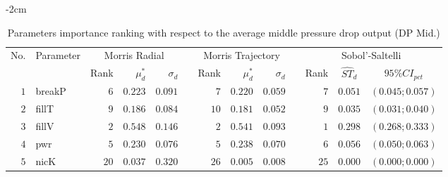 \begin{table*}[!htbp]\centering
{}
\begin{adjustwidth*}{}{-2cm}
\caption{Parameters importance ranking with respect to the average middle pressure drop output (DP Mid.)}
\label{tab:app_screening_dpmid_average}
\begin{tabular}{@{}rlrrrrrrrrrcc@{}}\toprule
\multirow{2}{*}{\footnotesize{No.}} & \multirow{2}{*}{\footnotesize{Parameter}} & \multicolumn{3}{c}{\footnotesize{Morris Radial}} & \phantom{a} & \multicolumn{3}{c}{\footnotesize{Morris Trajectory}}  &\phantom{a}& \multicolumn{3}{c}{\footnotesize{Sobol'-Saltelli}}                               \\             
                                                                                  \cmidrule{3-5}                                                   \cmidrule{7-9}                                                      \cmidrule{11-13}
                                    &                                           & \footnotesize{Rank}   & $\mu^*_d$ & $\sigma_d$   &             & \footnotesize{Rank} & $\mu^*_d$ & $\sigma_d$          &           & \footnotesize{Rank} & \footnotesize{$\hat{ST}_d$} & \footnotesize{$95\%CI_{pct}$}\\ \midrule
\footnotesize{$1 $} & \footnotesize{breakP   } & \footnotesize{$6 $} & \footnotesize{$0.223$} & \footnotesize{$0.091$} && \footnotesize{$7 $} & \footnotesize{$0.220$} & \footnotesize{$0.059$} && \footnotesize{$7 $} & \footnotesize{$0.051$} & \footnotesize{$(0.045;0.057)$} \\
\footnotesize{$2 $} & \footnotesize{fillT    } & \footnotesize{$9 $} & \footnotesize{$0.186$} & \footnotesize{$0.084$} && \footnotesize{$10$} & \footnotesize{$0.181$} & \footnotesize{$0.052$} && \footnotesize{$9 $} & \footnotesize{$0.035$} & \footnotesize{$(0.031;0.040)$} \\
\footnotesize{$3 $} & \footnotesize{fillV    } & \footnotesize{$2 $} & \footnotesize{$0.548$} & \footnotesize{$0.146$} && \footnotesize{$2 $} & \footnotesize{$0.541$} & \footnotesize{$0.093$} && \footnotesize{$1 $} & \footnotesize{$0.298$} & \footnotesize{$(0.268;0.333)$} \\
\footnotesize{$4 $} & \footnotesize{pwr      } & \footnotesize{$5 $} & \footnotesize{$0.230$} & \footnotesize{$0.076$} && \footnotesize{$5 $} & \footnotesize{$0.238$} & \footnotesize{$0.070$} && \footnotesize{$6 $} & \footnotesize{$0.056$} & \footnotesize{$(0.050;0.063)$} \\
\footnotesize{$5 $} & \footnotesize{nicK     } & \footnotesize{$20$} & \footnotesize{$0.037$} & \footnotesize{$0.320$} && \footnotesize{$26$} & \footnotesize{$0.005$} & \footnotesize{$0.008$} && \footnotesize{$25$} & \footnotesize{$0.000$} & \footnotesize{$(0.000;0.000)$} \\

\end{tabular}
\end{adjustwidth*}
\end{table*}
